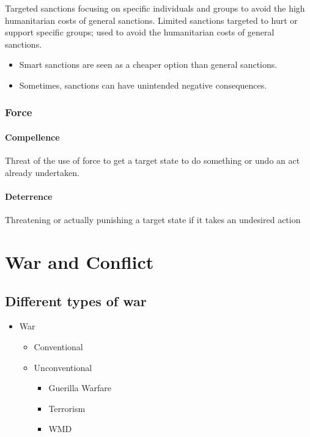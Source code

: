 \documentclass[
]{book}
\begin{document}
Targeted sanctions focusing on specific individuals and groups to avoid the high humanitarian costs of general sanctions. Limited sanctions targeted to hurt or support specific groups; used to avoid the humanitarian costs of general sanctions.

\begin{itemize}
\item
  Smart sanctions are seen as a cheaper option than general sanctions.
\item
  Sometimes, sanctions can have unintended negative consequences.
\end{itemize}

\hypertarget{force}{%
\subsection{Force}\label{force}}

\hypertarget{compellence}{%
\subsubsection{Compellence}\label{compellence}}

Threat of the use of force to get a target state to do something or undo an act already undertaken.

\hypertarget{deterrence}{%
\subsubsection{Deterrence}\label{deterrence}}

Threatening or actually punishing a target state if it takes an undesired action

\hypertarget{war-and-conflict}{%
\chapter{War and Conflict}\label{war-and-conflict}}

\hypertarget{different-types-of-war}{%
\section{Different types of war}\label{different-types-of-war}}

\begin{itemize}
\item
  War

  \begin{itemize}
  \item
    Conventional
  \item
    Unconventional

    \begin{itemize}
    \item
      Guerilla Warfare
    \item
      Terrorism
    \item
      WMD
    \end{itemize}
  \end{itemize}
\end{itemize}
\end{document}
